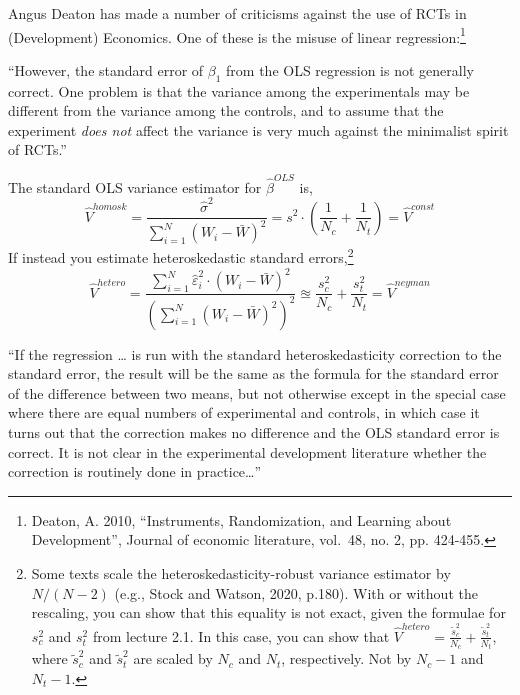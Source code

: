 \documentclass[
  letterpaper,
  DIV=11,
  numbers=noendperiod]{scrreprt}
\theoremstyle{definition}
\theoremstyle{remark}
\begin{document}
Angus Deaton has made a number of criticisms against the use of RCTs in
(Development) Economics. One of these is the misuse of linear
regression:\footnote{Deaton, A. 2010, ``Instruments, Randomization, and
  Learning about Development'', Journal of economic literature, vol.~48,
  no. 2, pp. 424-455.}

\begin{tcolorbox}[enhanced jigsaw, bottomrule=.15mm, coltitle=black, arc=.35mm, left=2mm, opacityback=0, leftrule=.75mm, colbacktitle=quarto-callout-tip-color!10!white, title={Deaton (2010, p.442)}, toprule=.15mm, bottomtitle=1mm, breakable, colframe=quarto-callout-tip-color-frame, opacitybacktitle=0.6, titlerule=0mm, colback=white, rightrule=.15mm, toptitle=1mm]

``However, the standard error of \(\beta_1\) from the OLS regression is
not generally correct. One problem is that the variance among the
experimentals may be different from the variance among the controls, and
to assume that the experiment \textit{does not} affect the variance is
very much against the minimalist spirit of RCTs.''

\end{tcolorbox}

The standard OLS variance estimator for \(\hat{\beta}^{OLS}\) is, \[
        \hat{V}^{homosk} = \frac{\hat{\sigma}^2}{\sum_{i=1}^{N}(W_i-\bar{W})^2}=s^2\cdot\left(\frac{1}{N_c}+\frac{1}{N_t}\right)=\hat{V}^{const}
\] If instead you estimate heteroskedastic standard
errors,\footnote{Some texts scale the heteroskedasticity-robust variance estimator by $N/(N-2)$ (e.g., Stock and Watson, 2020, p.180). With or without the rescaling, you can show that this equality is not exact, given the formulae for $s^2_c$ and $s^2_t$ from lecture 2.1. In this case, you can show that $\hat{V}^{hetero}= \frac{\tilde{s}^2_c}{N_c}+\frac{\tilde{s}^2_t}{N_t}$, where $\tilde{s}^2_c$ and $\tilde{s}^2_t$ are scaled by $N_c$ and $N_t$, respectively. Not by $N_c-1$ and $N_t-1$.}
\[
            \hat{V}^{hetero} = \frac{\sum_{i=1}^{N}\hat{\varepsilon}_i^2\cdot(W_i-\bar{W})^2}{\left(\sum_{i=1}^{N}(W_i-\bar{W})^2\right)^2} \approxeq \frac{s^2_c}{N_c}+\frac{s^2_t}{N_t}=\hat{V}^{neyman}
\]

\begin{tcolorbox}[enhanced jigsaw, bottomrule=.15mm, coltitle=black, arc=.35mm, left=2mm, opacityback=0, leftrule=.75mm, colbacktitle=quarto-callout-tip-color!10!white, title={Deaton (2010, p.442)}, toprule=.15mm, bottomtitle=1mm, breakable, colframe=quarto-callout-tip-color-frame, opacitybacktitle=0.6, titlerule=0mm, colback=white, rightrule=.15mm, toptitle=1mm]

``If the regression \ldots{} is run with the standard heteroskedasticity
correction to the standard error, the result will be the same as the
formula for the standard error of the difference between two means, but
not otherwise except in the special case where there are equal numbers
of experimental and controls, in which case it turns out that the
correction makes no difference and the OLS standard error is correct. It
is not clear in the experimental development literature whether the
correction is routinely done in practice\ldots{}''

\end{tcolorbox}
\end{document}
